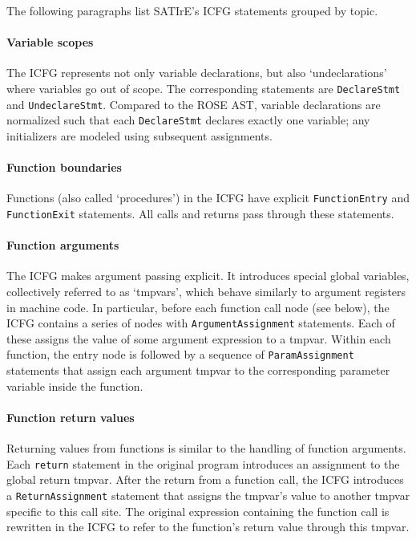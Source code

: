 \documentclass[a4paper,12pt]{report}
\begin{document}
The following paragraphs list SATIrE's ICFG statements grouped by topic.

\paragraph{Variable scopes} The ICFG represents not only variable
declarations, but also `undeclarations' where variables go out of scope. The
corresponding statements are \verb|DeclareStmt| and \verb|UndeclareStmt|.
Compared to the ROSE AST, variable declarations are normalized such that
each \verb|DeclareStmt| declares exactly one variable; any initializers are
modeled using subsequent assignments.

\paragraph{Function boundaries} Functions (also called `procedures') in the
ICFG have explicit \verb|FunctionEntry| and \verb|FunctionExit| statements.
All calls and returns pass through these statements.

\paragraph{Function arguments} The ICFG makes argument passing explicit. It
introduces special global variables, collectively referred to as `tmpvars',
which behave similarly to argument registers in machine code. In particular,
before each function call node (see below), the ICFG contains a series of
nodes with \verb|ArgumentAssignment| statements. Each of these assigns the
value of some argument expression to a tmpvar. Within each function, the
entry node is followed by a sequence of \verb|ParamAssignment| statements
that assign each argument tmpvar to the corresponding parameter variable
inside the function.

\paragraph{Function return values} Returning values from functions is
similar to the handling of function arguments. Each \verb|return| statement
in the original program introduces an assignment to the global return
tmpvar. After the return from a function call, the ICFG introduces a
\verb|ReturnAssignment| statement that assigns the tmpvar's value to another
tmpvar specific to this call site. The original expression containing the
function call is rewritten in the ICFG to refer to the function's return
value through this tmpvar.
\end{document}
